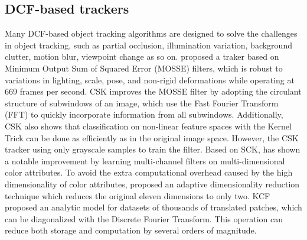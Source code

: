 \documentclass[review]{elsarticle}
\begin{document}
\begin{CJK*}{UTF8}{gbsn}
\subsection{DCF-based trackers}
Many DCF-based object tracking algorithms are designed to solve the challenges in object tracking, such as partial occlusion, illumination variation, background clutter, motion blur, viewpoint change as so on.
\cite{Bolme2010VisualOT} proposed a traker based on Minimum Output Sum of Squared Error (MOSSE) filters, which is robust to variations in lighting, scale, pose, and non-rigid deformations while operating at 669 frames per second.
CSK \cite{Henriques2012ExploitingTC} improves the MOSSE filter by adopting the circulant structure of subwindows of an image, which use the Fast Fourier Transform (FFT) to quickly incorporate information from all subwindows. Additionally, CSK also shows that classification on non-linear feature spaces with the Kernel Trick can be done as efficiently as in the original image space. However, the CSK tracker using only grayscale samples to train the filter.
Based on SCK, \cite{Danelljan2014AdaptiveCA} has shown a notable improvement by learning multi-channel filters on multi-dimensional color attributes. To avoid the extra computational overhead caused by the high dimensionality of color attributes, \cite{Danelljan2014AdaptiveCA} proposed an adaptive dimensionality reduction technique which reduces the original eleven dimensions to only two.
KCF \cite{Henriques2015HighSpeedTW} proposed an analytic model for datasets of thousands of translated patches, which can be diagonalized with the Discrete Fourier Transform. This operation can reduce both storage and computation by several orders of magnitude.


\end{CJK*}
\end{document}
